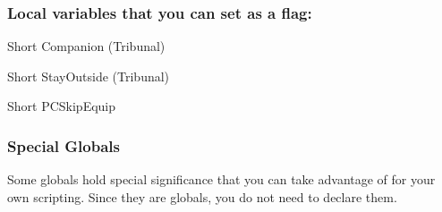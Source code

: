 \documentclass[
]{article}
\begin{document}
\hypertarget{local-variables-that-you-can-set-as-a-flag}{%
\subsubsection{Local variables that you can set as a
flag:}\label{local-variables-that-you-can-set-as-a-flag}}

Short Companion (Tribunal)

Short StayOutside (Tribunal)

Short PCSkipEquip

\hypertarget{special-globals}{%
\subsubsection{Special Globals}\label{special-globals}}

Some globals hold special significance that you can take advantage of
for your own scripting. Since they are globals, you do not need to
declare them.
\end{document}
